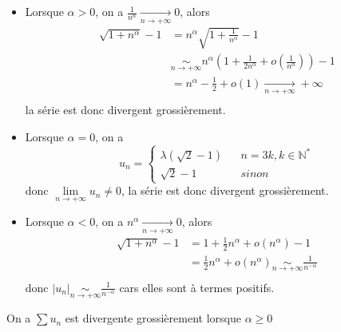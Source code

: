 \documentclass[a4paper,12pt]{book}
\begin{document}
\renewcommand{\labelitemi}{$\blacktriangleright$}
\renewcommand{\labelitemii}{$\bullet$}


\section{}
\begin{itemize}
    \item Lorsque $\alpha >0$, on a $\frac{1}{n^\alpha} \xrightarrow[n \to +\infty]{} 0$,
    alors 
    \begin{align*}
        \sqrt{1+n^\alpha}-1&=n^\alpha \sqrt{1+\frac{1}{n^\alpha}}-1 \\
                           &\mathop{\sim}\limits_{n \to +\infty}
                           n^\alpha \left(1+\frac{1}{2n^\alpha}+o\left(\frac{1}{n^\alpha}\right)\right)-1\\
                           &=n^\alpha-\frac{1}{2}+o(1)\xrightarrow[n \to +\infty]{} +\infty\\
    \end{align*}
    la série est donc divergent grossièrement. \\
    \item  Lorsque $\alpha =0$, on a
    \begin{equation}  \nonumber
        u_n=\left\{  
                     \begin{array}{rcl}  
                     \lambda(\sqrt{2}-1) & & {n=3k, k\in \mathbb{N}^*}\\  
                     \sqrt{2}-1 & & sinon   
                     \end{array}  
        \right.  
        \end{equation} 
    donc $\lim\limits_{n \to +\infty} u_n \neq 0$, la série est donc divergent grossièrement. \\
    \item Lorsque $\alpha <0$, on a $n^\alpha \xrightarrow[n \to +\infty]{} 0$, alors
    \begin{align*}
        \sqrt{1+n^\alpha}-1&=1+\frac{1}{2}n^\alpha+o(n^\alpha)-1 \\
                           &= \frac{1}{2}n^\alpha+o(n^\alpha) \mathop{\sim}\limits_{n \to +\infty} \frac{1}{n^{-\alpha}}\\
    \end{align*}
    donc $|u_n|\mathop{\sim}\limits_{n \to +\infty} \frac{1}{n^{-\alpha}}$ cars elles sont à termes positifs.
\end{itemize}
On a $\sum u_n$ est divergente grossièrement lorsque $\boxed{\alpha \geq 0}$
\end{document}

